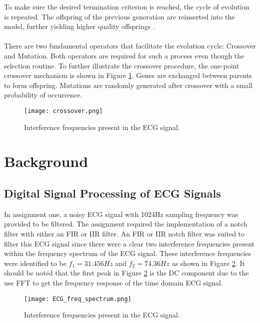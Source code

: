 \documentclass[a4paper, 11pt]{article}
\begin{document}
    To make sure the desired termination criterion is reached, the cycle of evolution is repeated. The offspring of 
    the previous generation are reinserted into the model, further yielding higher quality offsprings \cite{Man1997}.
    \\\\
    There are two fundamental operators that facilitate the evolution cycle: Crossover and Mutation. Both operators 
    are required for such a process even though the selection routine. To further illustrate the crossover procedure, 
    the one-point crossover mechanism is shown in Figure \ref{Fig:crossover}. Genes are exchanged between parents to form 
    offspring. Mutations are randomly generated after crossover with a small probability of occurrence.
    
    \begin{figure}[h!]
        \centering
        \graphicspath{{./wiki/}}
        \texttt{[image: crossover.png]}
        \caption{Interference frequencies present in the ECG signal.}
        \label{Fig:crossover}
    \end{figure}

\section{Background}\label{sec:bg}
    \subsection{Digital Signal Processing of ECG Signals}\label{sec:bg_sub1}
        In assignment one, a noisy ECG signal with 1024Hz sampling frequency was provided to be filtered. 
        The assignment required the implementation of a notch filter with either an FIR or IIR filter.
        An FIR or IIR notch filter was suited to filter this ECG signal since there were a clear two 
        interference frequencies present within the frequency spectrum of the ECG signal.
        These interference frequencies were identified to be $f_{1} = 31.456Hz$ and $f_{2} = 74.36Hz$
        as shown in Figure \ref{Fig:rejFreq}. It should be noted that the first peak in Figure \ref{Fig:rejFreq} is the 
        DC component due to the use FFT to get the frequency response of the time domain ECG signal.
        
        \begin{figure}[h!]
            \centering
            \graphicspath{{./wiki/}}
            \texttt{[image: ECG\_freq\_spectrum.png]}
            \caption{Interference frequencies present in the ECG signal.}
            \label{Fig:rejFreq}
        \end{figure}
\end{document}
